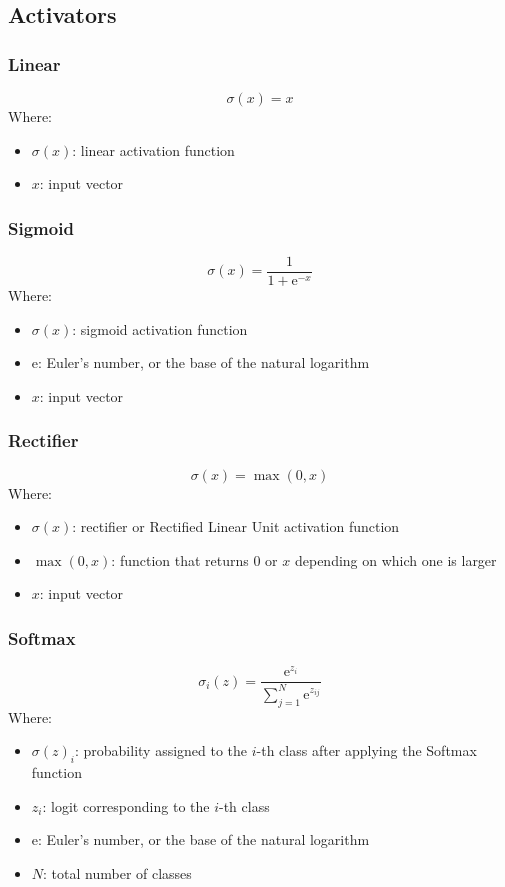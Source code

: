 \documentclass[a4paper]{report}
\newcommand{\euler}{\mathrm{e}}
\begin{document}
\subsection{Activators}
\subsubsection*{Linear}
\begin{equation*}
    \sigma(x) = x
\end{equation*}
Where:
\begin{itemize}
    \item $\sigma(x)$: linear activation function
    \item $x$: input vector
\end{itemize}

\subsubsection*{Sigmoid}
\begin{equation*}
    \sigma(x) = \frac{1}{1+\euler^{-x}}
\end{equation*}
Where:
\begin{itemize}
    \item $\sigma(x)$: sigmoid activation function
    \item $\euler$: Euler's number, or the base of the natural logarithm
    \item $x$: input vector
\end{itemize}

\subsubsection*{Rectifier}
\begin{equation*}
    \sigma(x) = \max(0,x)
\end{equation*}
Where:
\begin{itemize}
    \item $\sigma(x)$: rectifier or Rectified Linear Unit activation function
    \item $\max(0,x)$: function that returns 0 or $x$ depending on which one is larger
    \item $x$: input vector
\end{itemize}

\subsubsection*{Softmax}
\begin{equation*}
    \sigma_i(z) = \frac{\euler^{z_i}}{\sum_{j=1}^{N} \euler^{z_{ij}}}
\end{equation*}
Where:
\begin{itemize}
    \item $\sigma(z)_i$: probability assigned to the $i$-th class after applying the Softmax function
    \item $z_i$: logit corresponding to the $i$-th class
    \item $\euler$: Euler's number, or the base of the natural logarithm
    \item $N$: total number of classes
\end{itemize}
\end{document}

